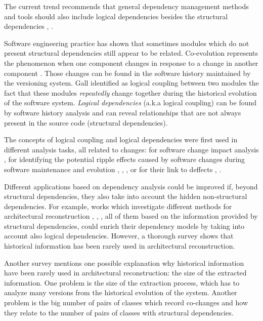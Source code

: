 \documentclass[12pt]{mitthesis}
\begin{document}
The current trend recommends that general dependency management methods and tools should also include logical dependencies besides the structural dependencies \cite{Oliva:2011:ISL:2067853.2068086}, \cite{DBLP:journals/jss/AjienkaC17}. 

Software engineering practice has shown that sometimes modules which do not present structural dependencies still appear to be related. Co-evolution represents the phenomenon when one component changes in response to a change in another component \cite{Yu:2007:UCC:1231330.1231370}. Those changes can be found in the software history maintained by the versioning system. Gall \cite{Gall:1998:DLC:850947.853338} identified as logical coupling between two modules the fact that these modules  \textit{repeatedly} change together during the historical evolution of the software system. 
 \textit{Logical dependencies} (a.k.a logical coupling) can be found by software history analysis and can reveal relationships that are not always present in the source code (structural dependencies).  

The concepts of logical coupling and logical dependencies were first used in different analysis tasks, all related to changes: for software change impact analysis \cite{1553643}, for identifying the potential ripple effects caused by software changes during software maintenance and evolution \cite{DBLP:conf/issre/OlivaG15}, \cite{Oliva:2011:ISL:2067853.2068086}, \cite{Poshyvanyk2009}, \cite{posh2010} or for their link to deffects \cite{wiese}, \cite{Zimmermann:2004:MVH:998675.999460}.

Different applications based on dependency analysis could be improved if, beyond structural dependencies, they also take into account the hidden non-structural dependencies. For example, works  which investigate different methods for architectural reconstruction \cite{SoraConti}, \cite{SoraSem13}, \cite{PagerankENASE},  all of them based on the information provided by structural dependencies, could enrich their dependency models by taking into account also logical dependencies. However, a thorough survey \cite{sar} shows that historical information has been rarely used in architectural reconstruction. 

Another survey \cite{Shtern:2012:CMS:2332427.2332428} mentions one possible explanation why historical information have been rarely used in architectural reconstruction: the size of the extracted information. One problem is the size of the extraction process, which has to analyze many versions from the historical evolution of the system. Another problem is the big number of pairs of classes which record co-changes and how they relate to the number of pairs of classes with structural dependencies.
\end{document}
